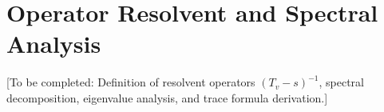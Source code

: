 \section{Operator Resolvent and Spectral Analysis}

[To be completed: Definition of resolvent operators $(T_v - s)^{-1}$, spectral decomposition, eigenvalue analysis, and trace formula derivation.]
